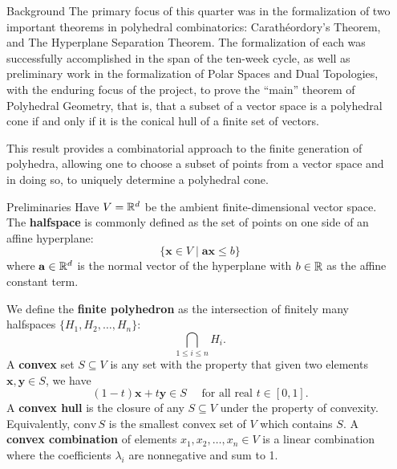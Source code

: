 \documentclass[final]{beamer}
\newlength{\sepwidth}
\newlength{\colwidth}
\newcommand{\separatorcolumn}{\begin{column}{\sepwidth}\end{column}}
\begin{document}
\begin{frame}[fragile]
    \begin{columns}[t]
        \separatorcolumn

        \begin{column}{\colwidth}

            \begin{block}{Background}    
                The primary focus of this quarter was in the formalization of two important theorems in polyhedral combinatorics: Carath\'eordory's Theorem, and The Hyperplane Separation Theorem. The formalization of each was successfully accomplished in the span of the ten-week cycle, as well as preliminary work in the formalization of Polar Spaces and Dual Topologies, with the enduring focus of the project, to prove the ``main'' theorem of Polyhedral Geometry, that is, that a subset of a vector space is a polyhedral cone if and only if it is the conical hull of a finite set of vectors.

                This result provides a combinatorial approach to the finite generation of polyhedra, allowing one to choose a subset of points from a vector space and in doing so, to uniquely determine a polyhedral cone.
            \end{block}

            \begin{block}{Preliminaries}
                Have $V = \mathbb{R}^d$ be the ambient finite-dimensional vector space. The \textbf{halfspace} is commonly defined as the set of points on one side of an affine hyperplane:
                $$ \{\mathbf{x} \in V \;|\; \mathbf{ax} \leq b\}$$
                where $\mathbf{a} \in \mathbb{R}^d$ is the normal vector of the hyperplane with $b \in \mathbb{R}$ as the affine constant term.

                We define the \textbf{finite polyhedron} as the intersection of finitely many halfspaces $\{H_1,H_2,\dots,H_n\}$:
                $$ \bigcap_{1 \leq i \leq n} H_i. $$
                A \textbf{convex} set $S \subseteq V$ is any set with the property that given two elements $\mathbf{x}, \mathbf{y} \in S$, we have
                $$ (1 - t)\mathbf{x} + t\mathbf{y} \in S \quad \text{ for all real } t \in [0,1].$$
                A \textbf{convex hull} is the closure of any $S \subseteq V$ under the property of convexity. Equivalently, $\text{conv}\,S$ is the smallest convex set of $V$ which contains $S$. A \textbf{convex combination} of elements $x_1,x_2,\dots,x_n \in V$ is a linear combination where the coefficients $\lambda_i$ are nonnegative and sum to 1. 


\end{block}
\end{column}
\end{columns}
\end{frame}
\end{document}
